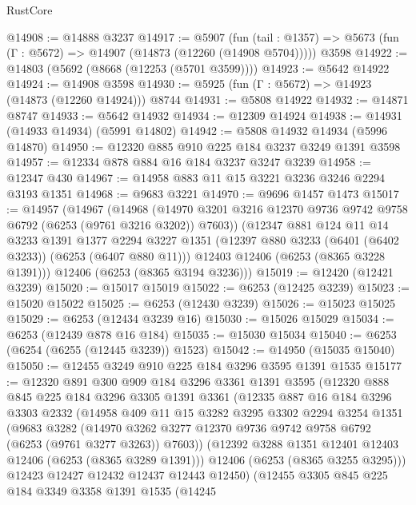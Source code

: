 \begin{lexlean}{RustCore}
\begin{coremodule}
@14908 := @14888 @3237
@14917 := @5907
    (fun (tail : @1357) => @5673 (fun (Γ : @5672) => @14907 (@14873 (@12260 (@14908 @5704)))))
    @3598
@14922 := @14803 (@5692 (@8668 (@12253 (@5701 @3599))))
@14923 := @5642 @14922
@14924 := @14908 @3598
@14930 := @5925 (fun (Γ : @5672) => @14923 (@14873 (@12260 @14924))) @8744
@14931 := @5808 @14922
@14932 := @14871 @8747
@14933 := @5642 @14932
@14934 := @12309 @14924
@14938 := @14931 (@14933 @14934) (@5991 @14802)
@14942 := @5808 @14932 @14934 (@5996 @14870)
@14950 := @12320 @885 @910 @225 @184 @3237 @3249 @1391 @3598
@14957 := @12334 @878 @884 @16 @184 @3237 @3247 @3239
@14958 := @12347 @430
@14967 := @14958 @883 @11 @15 @3221 @3236 @3246 @2294 @3193 @1351
@14968 := @9683 @3221
@14970 := @9696 @1457 @1473
@15017 := @14957
    (@14967
      (@14968 (@14970 @3201 @3216 @12370 @9736 @9742 @9758 @6792 (@6253 (@9761 @3216 @3202)) @7603))
      (@12347
        @881
        @124
        @11
        @14
        @3233
        @1391
        @1377
        @2294
        @3227
        @1351
        (@12397 @880 @3233 (@6401 (@6402 @3233)) (@6253 (@6407 @880 @11)))
        @12403
        @12406
        (@6253 (@8365 @3228 @1391)))
      @12406
      (@6253 (@8365 @3194 @3236)))
@15019 := @12420 (@12421 @3239)
@15020 := @15017 @15019
@15022 := @6253 (@12425 @3239)
@15023 := @15020 @15022
@15025 := @6253 (@12430 @3239)
@15026 := @15023 @15025
@15029 := @6253 (@12434 @3239 @16)
@15030 := @15026 @15029
@15034 := @6253 (@12439 @878 @16 @184)
@15035 := @15030 @15034
@15040 := @6253 (@6254 (@6255 (@12445 @3239)) @1523)
@15042 := @14950 (@15035 @15040)
@15050 := @12455 @3249 @910 @225 @184 @3296 @3595 @1391 @1535
@15177 := @12320
    @891
    @300
    @909
    @184
    @3296
    @3361
    @1391
    @3595
    (@12320
      @888
      @845
      @225
      @184
      @3296
      @3305
      @1391
      @3361
      (@12335
        @887
        @16
        @184
        @3296
        @3303
        @2332
        (@14958
          @409
          @11
          @15
          @3282
          @3295
          @3302
          @2294
          @3254
          @1351
          (@9683
            @3282
            (@14970 @3262 @3277 @12370 @9736 @9742 @9758 @6792 (@6253 (@9761 @3277 @3263)) @7603))
          (@12392 @3288 @1351 @12401 @12403 @12406 (@6253 (@8365 @3289 @1391)))
          @12406
          (@6253 (@8365 @3255 @3295)))
        @12423
        @12427
        @12432
        @12437
        @12443
        @12450)
      (@12455
        @3305
        @845
        @225
        @184
        @3349
        @3358
        @1391
        @1535
        (@14245

\end{coremodule}
\end{lexlean}
